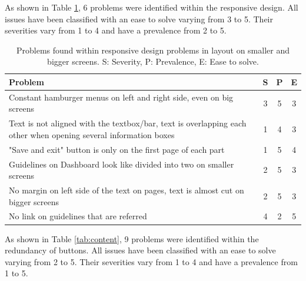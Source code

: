 \documentclass{sigchi}
\begin{document}
As shown in Table \ref{tab:responsiveDesign}, 6 problems were identified within the responsive design. All issues have been classified with an ease to solve varying from 3 to 5. Their severities vary from 1 to 4 and have a prevalence from 2 to 5.

\begin{table}[H]
    \centering
    \begin{tabular}{|m{6.5cm}|c|c|c|}
    \hline
        \textbf{Problem} & \textbf{S} & \textbf{P} & \textbf{E}\\
    \hline
         Constant hamburger menus on left and right side, even on big screens & 3 & 5 & 3\\
    \hline
         Text is not aligned with the textbox/bar, text is overlapping each other when opening several information boxes & 1 & 4 & 3\\
    \hline
         "Save and exit" button is only on the first page of each part & 1 & 5 & 4\\
    \hline
         Guidelines on Dashboard look like divided into two on smaller screens & 2 & 5 & 3\\
    \hline
         No margin on left side of the text on pages, text is almost cut on bigger screens & 2 & 5 & 3\\
    \hline
         No link on guidelines that are referred & 4 & 2 & 5\\
    \hline
    \end{tabular}
    \caption{Problems found within responsive design problems in layout on smaller and bigger screens. S: Severity, P: Prevalence, E: Ease to solve.}
    \label{tab:responsiveDesign}
\end{table}

As shown in Table \ref{tab:content}, 9 problems were identified within the redundancy of buttons. All issues have been classified with an ease to solve varying from 2 to 5. Their severities vary from 1 to 4 and have a prevalence from 1 to 5.
\end{document}
